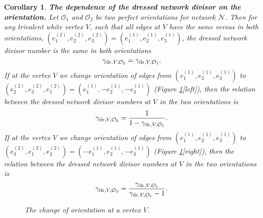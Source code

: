 \documentclass[11pt]{amsart}
\theoremstyle{plain}
\numberwithin{equation}{section}
\newtheorem{corollary}[theorem]{Corollary}
\begin{document}
\begin{corollary}\label{cor:indep_orient}\textbf{The dependence of the dressed network divisor on the orientation.}
Let ${\mathcal O}_1$ and ${\mathcal O}_2$ be two perfect orientations for network ${\mathcal N}$.
Then for any trivalent white vertex $V$, such that all edges at $V$ have the same versus in both orientations, $(e_1^{(2)},e_2^{(2)},e_3^{(2)})=(e_1^{(1)},e_2^{(1)},e_3^{(1)})$, the dressed network divisor number is the same in both
orientations 
\begin{equation}\label{eq:inep_gauge_1}
\gamma_{\textup{\scriptsize dr},V,\mathcal O_2} = \gamma_{\textup{\scriptsize dr},V,\mathcal O_1}.
\end{equation}
If at the vertex $V$ we change orientation of edges from $(e_1^{(1)},e_2^{(1)},e_3^{(1)})$ to $(e_2^{(2)},e_3^{(2)},e_1^{(2)})=(e_1^{(1)},-e_2^{(1)},-e_3^{(1)})$ (Figure \ref{fig:phi_orient}[left]), then the relation between the dressed network divisor numbers at $V$ in the two orientations is
\begin{equation}\label{eq:inep_gauge_2}
\gamma_{\textup{\scriptsize dr},V,\mathcal O_2} = \frac{1}{1-\gamma_{\textup{\scriptsize dr},V,\mathcal O_1}}.
\end{equation}
If at the vertex $V$ we change orientation of edges from $(e_1^{(1)},e_2^{(1)},e_3^{(1)})$ to $(e_3^{(2)},e_1^{(2)},e_2^{(2)})=(-e_1^{(1)},e_2^{(1)},-e_3^{(1)})$ (Figure \ref{fig:phi_orient}[right]), then the relation between the dressed network divisor numbers at $V$ in the two orientations is
\begin{equation}\label{eq:inep_gauge_3}
\gamma_{\textup{\scriptsize dr},V,\mathcal O_2} = \frac{\gamma_{\textup{\scriptsize dr},V,\mathcal O_1}}{\gamma_{\textup{\scriptsize dr},V,\mathcal O_1}-1}.
\end{equation}
\end{corollary}

\begin{figure}%
	\vspace{-3.7 truecm}
  \caption{\small{\sl The change of orientation at a vertex $V$.}\label{fig:phi_orient}}
\end{figure}
\end{document}
